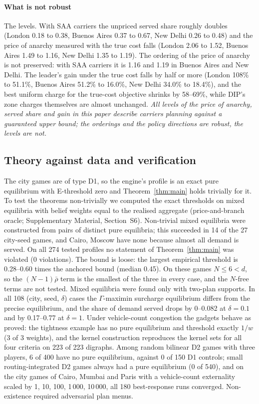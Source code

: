 \documentclass[preprint,11pt]{elsarticle}
\theoremstyle{definition}
\theoremstyle{remark}
\newcommand{\SM}[1]{Supplementary Material, Section~#1}
\begin{document}
\paragraph{What is not robust} The levels. With SAA carriers the unpriced served share roughly doubles (London 0.18 to 0.38, Buenos Aires 0.37 to 0.67, New Delhi 0.26 to 0.48) and the price of anarchy measured with the true cost falls (London 2.06 to 1.52, Buenos Aires 1.49 to 1.16, New Delhi 1.35 to 1.19). The ordering of the price of anarchy is not preserved: with SAA carriers it is 1.16 and 1.19 in Buenos Aires and New Delhi. The leader's gain under the true cost falls by half or more (London 108\% to 51.1\%, Buenos Aires 51.2\% to 16.0\%, New Delhi 34.0\% to 18.4\%), and the best uniform charge for the true-cost objective shrinks by 58--69\%, while DIP's zone charges themselves are almost unchanged. \emph{All levels of the price of anarchy, served share and gain in this paper describe carriers planning against a guaranteed upper bound; the orderings and the policy directions are robust, the levels are not.}

\subsection{Theory against data and verification}\label{sec:res-theory}\label{sec:res-verif}

The city games are of type D1, so the engine's profile is an exact pure equilibrium with E-threshold zero and Theorem~\ref{thm:main} holds trivially for it. To test the theorems non-trivially we computed the exact thresholds on mixed equilibria with belief weights equal to the realised aggregate (price-and-branch oracle; \SM{S6}). Non-trivial mixed equilibria were constructed from pairs of distinct pure equilibria; this succeeded in 14 of the 27 city-seed games, and Cairo, Moscow have none because almost all demand is served. On all 274 tested profiles no statement of Theorem~\ref{thm:main} was violated (0 violations). The bound is loose: the largest empirical threshold is 0.28--0.60 times the anchored bound (median 0.45). On these games $N\le6<d$, so the $(N-1)\bar\rho$ term is the smallest of the three in every case, and the $N$-free terms are not tested. Mixed equilibria were found only with two-plan supports. In all 108 (city, seed, $\delta$) cases the $\Gamma$-maximin surcharge equilibrium differs from the precise equilibrium, and the share of demand served drops by 0--0.082 at $\delta=0.1$ and by 0.17--0.77 at $\delta=1$. Under vehicle-count congestion the gadgets behave as proved: the tightness example has no pure equilibrium and threshold exactly $1/w$ (3 of 3 weights), and the kernel construction reproduces the kernel sets for all four criteria on 223 of 223 digraphs. Among random bilinear D2 games with three players, 6 of 400 have no pure equilibrium, against 0 of 150 D1 controls; small routing-integrated D2 games always had a pure equilibrium (0 of 540), and on the city games of Cairo, Mumbai and Paris with a vehicle-count externality scaled by 1, 10, 100, 1\,000, 10\,000, all 180 best-response runs converged. Non-existence required adversarial plan menus.
\end{document}
